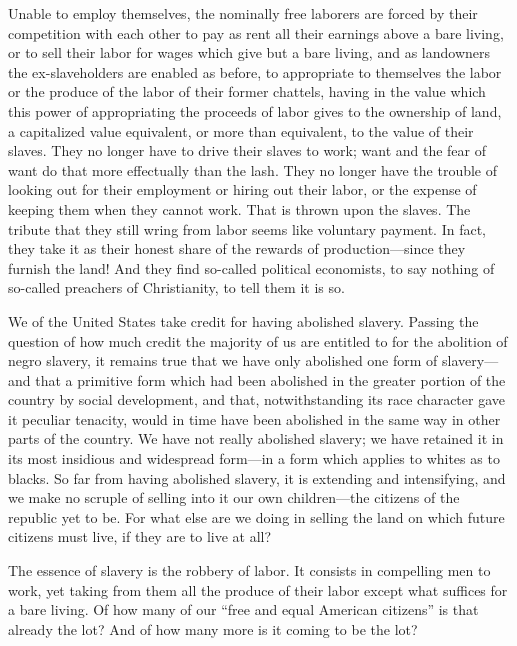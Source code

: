 \documentclass{book}
\begin{document}
Unable to employ themselves, the nominally free laborers are forced by their competition with each other to pay as rent all their earnings above a bare living, or to sell their labor for wages which give but a bare living, and as landowners the ex-slaveholders are enabled as before, to appropriate to themselves the labor or the produce of the labor of their former chattels, having in the value which this power of appropriating the proceeds of labor gives to the ownership of land, a capitalized value equivalent, or more than equivalent, to the value of their slaves. They no longer have to drive their slaves to work; want and the fear of want do that more effectually than the lash. They no longer have the trouble of looking out for their employment or hiring out their labor, or the expense of keeping them when they cannot work. That is thrown upon the slaves. The tribute that they still wring from labor seems like voluntary payment. In fact, they take it as their honest share of the rewards of production—since they furnish the land! And they find so-called political economists, to say nothing of so-called preachers of Christianity, to tell them it is so.

We of the United States take credit for having abolished slavery. Passing the question of how much credit the majority of us are entitled to for the abolition of negro slavery, it remains true that we have only abolished one form of slavery—and that a primitive form which had been abolished in the greater portion of the country by social development, and that, notwithstanding its race character gave it peculiar tenacity, would in time have been abolished in the same way in other parts of the country. We have not really abolished slavery; we have retained it in its most insidious and widespread form—in a form which applies to whites as to blacks. So far from having abolished slavery, it is extending and intensifying, and we make no scruple of selling into it our own children—the citizens of the republic yet to be. For what else are we doing in selling the land on which future citizens must live, if they are to live at all?

The essence of slavery is the robbery of labor. It consists in compelling men to work, yet taking from them all the produce of their labor except what suffices for a bare living. Of how many of our “free and equal American citizens” is that already the lot? And of how many more is it coming to be the lot?
\end{document}

